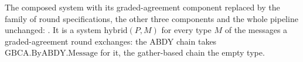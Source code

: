 \begin{definition}
  \label{def:aba-hybrid}
  \leanok
  The composed system with its graded-agreement component replaced by the family of round specifications, the other three components and the whole pipeline unchanged: .
  It is a system $\mathrm{hybrid}(P, M)$ for every type $M$ of the messages a graded-agreement round exchanges: the ABDY chain takes $\mathrm{GBCA.ByABDY.Message}$ for it, the gather-based chain the empty type.
\end{definition}
